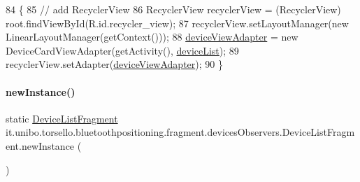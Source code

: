 \begin{DoxyCode}
84                                                    \{
85         \textcolor{comment}{// add RecyclerView}
86         RecyclerView recyclerView = (RecyclerView) root.findViewById(R.id.recycler\_view);
87         recyclerView.setLayoutManager(\textcolor{keyword}{new} LinearLayoutManager(getContext()));
88         \hyperlink{classit_1_1unibo_1_1torsello_1_1bluetoothpositioning_1_1fragment_1_1devicesObservers_1_1DeviceListFragment_a5a6d0882c9d5551b13936776fb712b0a_a5a6d0882c9d5551b13936776fb712b0a}{deviceViewAdapter} = \textcolor{keyword}{new} DeviceCardViewAdapter(getActivity(), 
      \hyperlink{classit_1_1unibo_1_1torsello_1_1bluetoothpositioning_1_1fragment_1_1devicesObservers_1_1DeviceListFragment_ad728f2e256af2d4acf05d3cf900f3ad4_ad728f2e256af2d4acf05d3cf900f3ad4}{deviceList});
89         recyclerView.setAdapter(\hyperlink{classit_1_1unibo_1_1torsello_1_1bluetoothpositioning_1_1fragment_1_1devicesObservers_1_1DeviceListFragment_a5a6d0882c9d5551b13936776fb712b0a_a5a6d0882c9d5551b13936776fb712b0a}{deviceViewAdapter});
90     \}
\end{DoxyCode}
\hypertarget{classit_1_1unibo_1_1torsello_1_1bluetoothpositioning_1_1fragment_1_1devicesObservers_1_1DeviceListFragment_aae7377d92372118bec0bd8a6aa2c61c0_aae7377d92372118bec0bd8a6aa2c61c0}{}\label{classit_1_1unibo_1_1torsello_1_1bluetoothpositioning_1_1fragment_1_1devicesObservers_1_1DeviceListFragment_aae7377d92372118bec0bd8a6aa2c61c0_aae7377d92372118bec0bd8a6aa2c61c0} 
\paragraph{\texorpdfstring{new\+Instance()}{newInstance()}}
{\footnotesize\ttfamily static \hyperlink{classit_1_1unibo_1_1torsello_1_1bluetoothpositioning_1_1fragment_1_1devicesObservers_1_1DeviceListFragment}{Device\+List\+Fragment} it.\+unibo.\+torsello.\+bluetoothpositioning.\+fragment.\+devices\+Observers.\+Device\+List\+Fragment.\+new\+Instance (\begin{DoxyParamCaption}{ }\end{DoxyParamCaption})\hspace{0.3cm}{\ttfamily [static]}}


